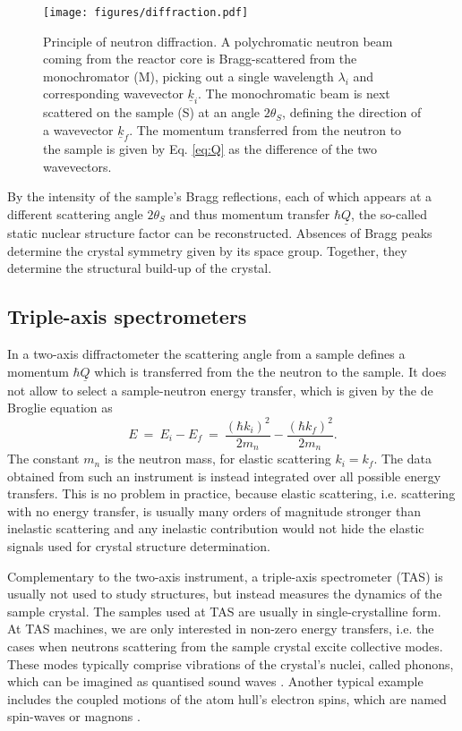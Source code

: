 \begin{figure}[htb]
	\centering
	\texttt{[image: figures/diffraction.pdf]}
	\caption[Neutron diffraction.]{
		Principle of neutron diffraction. A polychromatic neutron beam coming from the reactor core is Bragg-scattered
		from the monochromator (M), picking out a single wavelength $\lambda_i$ and corresponding wavevector $\underline{k}_i$.
		The monochromatic beam is next scattered on the sample (S) at an angle $2\theta_S$, defining the direction of a
		wavevector $\underline{k}_f$. The momentum transferred from the neutron to the sample is given by Eq. \ref{eq:Q}
		as the difference of the two wavevectors.}
	\label{fig:diffraction}
\end{figure}

By the intensity of the sample's Bragg reflections, each of which appears at a different scattering angle $2\theta_S$
and thus momentum transfer $\hbar \underline{Q}$, the so-called static nuclear structure factor \cite[p. 25]{Shirane2002}
can be reconstructed. Absences of Bragg peaks determine the crystal symmetry given by its space group. Together,
they determine the structural build-up of the crystal.


\subsection{Triple-axis spectrometers}

In a two-axis diffractometer the scattering angle from a sample defines a momentum $\hbar \underline{Q}$ which is
transferred from the the neutron to the sample. It does not allow to select a sample-neutron energy transfer,
which is given by the de Broglie equation as \cite[p. 89]{Gross2012} \cite[p. 11]{Shirane2002}
\begin{equation}
	\label{eq:E}
	E \ =\ E_i - E_f \ =\ \frac{\left( \hbar k_i \right)^2}{2 m_n} - \frac{\left( \hbar k_f \right)^2}{2 m_n}.
\end{equation}
The constant $m_n$ is the neutron mass, for elastic scattering $k_i = k_f$.
The data obtained from such an instrument is instead integrated over all possible energy transfers.
This is no problem in practice, because elastic scattering, i.e. scattering with no energy transfer,
is usually many orders of magnitude stronger than inelastic scattering and any inelastic contribution
would not hide the elastic signals used for crystal structure determination.

Complementary to the two-axis instrument, a triple-axis spectrometer (TAS) is usually not used to study structures,
but instead measures the dynamics of the sample crystal. The samples used at TAS are usually in single-crystalline form.
At TAS machines, we are only interested in non-zero energy transfers, i.e. the cases when neutrons scattering from the
sample crystal excite collective modes. These modes typically comprise vibrations of the crystal's nuclei, called phonons,
which can be imagined as quantised sound waves \cite[pp. 123-137]{Shirane2002}. Another typical example includes the
coupled motions of the atom hull's electron spins, which are named spin-waves or magnons \cite[pp. 137-144]{Shirane2002}.

